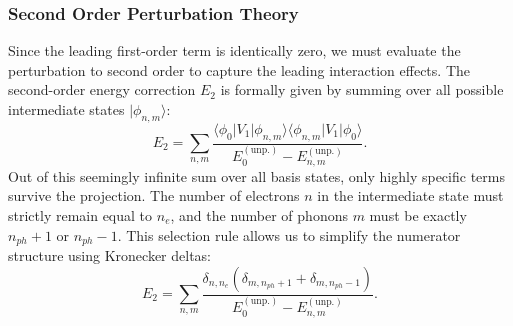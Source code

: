 \subsubsection{Second Order Perturbation Theory}

Since the leading first-order term is identically zero, we must evaluate the perturbation to second order to capture the leading interaction effects. The second-order energy correction \(E_2\) is formally given by summing over all possible intermediate states \(|\phi_{n,m}\rangle\):
\[
    E_2 = \sum_{n,m} \frac{\langle \phi_0 | V_1 | \phi_{n,m} \rangle \langle \phi_{n,m} | V_1 | \phi_0 \rangle}{E_0^{(\text{unp.})} - E_{n,m}^{(\text{unp.})}}.
\]
Out of this seemingly infinite sum over all basis states, only highly specific terms survive the projection. The number of electrons \(n\) in the intermediate state must strictly remain equal to \(n_e\), and the number of phonons \(m\) must be exactly \(n_{ph} + 1\) or \(n_{ph} - 1\). This selection rule allows us to simplify the numerator structure using Kronecker deltas:
\[
    E_2 = \sum_{n,m} \frac{\delta_{n,n_e} \left( \delta_{m,n_{ph}+1} + \delta_{m,n_{ph}-1} \right)}{E_0^{(\text{unp.})} - E_{n,m}^{(\text{unp.})}}.
\]

